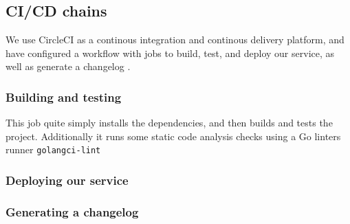 \subsection{CI/CD chains}
%


We use CircleCI as a continous integration and continous delivery platform, and have configured a workflow with jobs to build, test, and deploy our service, as well as generate a changelog \cite{workflow:circleci}.


\subsubsection{Building and testing}

This job quite simply installs the dependencies, and then builds and tests the project. Additionally it runs some static code analysis checks using a Go linters runner \texttt{golangci-lint}


\subsubsection{Deploying our service}




\subsubsection{Generating a changelog}


